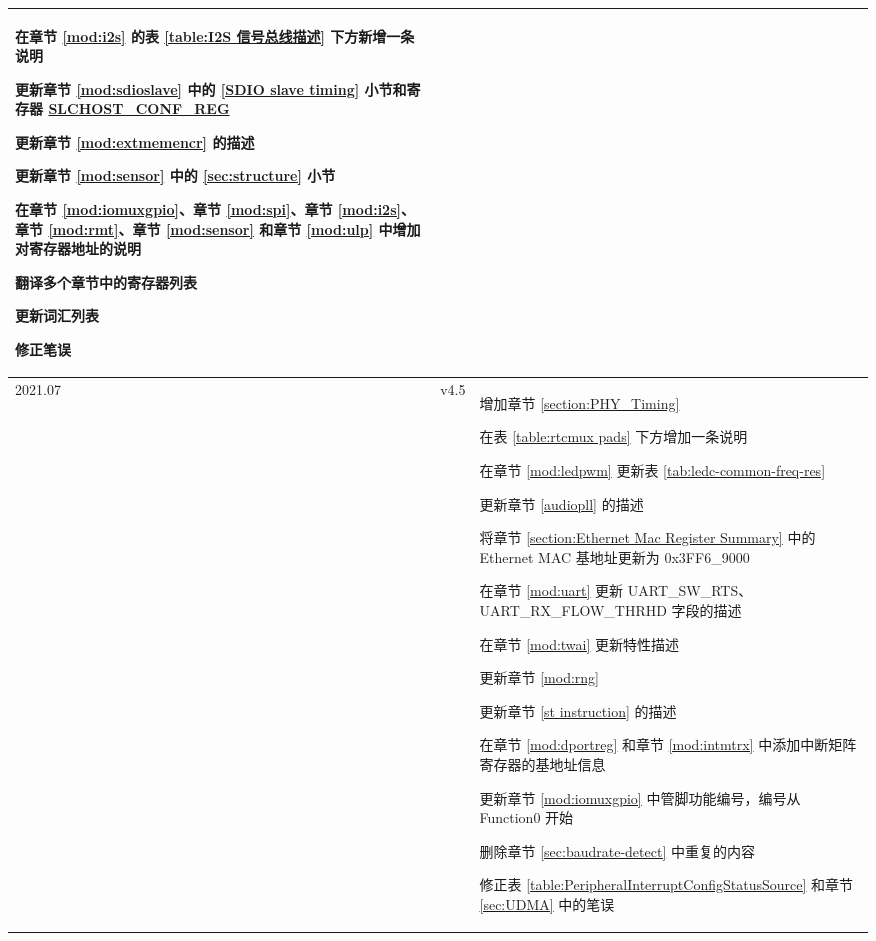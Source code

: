 \begin{longtable}[l]{ | m{2cm} | m{1.5cm} | m{12cm} | }
    在章节 \ref{mod:i2s} \textit{\nameref{mod:i2s}} 的表 \ref{table:I2S 信号总线描述} 下方新增一条说明 %

    更新章节 \ref{mod:sdioslave} \textit{\nameref{mod:sdioslave}} 中的 \ref{SDIO slave timing} 小节和寄存器 \hyperref[regdesc:SLCHOSTCONFREG]{SLCHOST\_CONF\_REG} %

    更新章节 \ref{mod:extmemencr} \textit{\nameref{mod:extmemencr}} 的描述 %

    更新章节 \ref{mod:sensor} \textit{\nameref{mod:sensor}} 中的 \ref{sec:structure} 小节 %

    在章节 \ref{mod:iomuxgpio}、章节 \ref{mod:spi}、章节 \ref{mod:i2s}、章节 \ref{mod:rmt}、章节 \ref{mod:sensor} 和章节 \ref{mod:ulp} 中增加对寄存器地址的说明 %

    翻译多个章节中的寄存器列表 %

    更新词汇列表 %

    修正笔误 %
    \\\hline
2021.07 & v4.5 &
增加章节 \ref{section:PHY_Timing} %

在表 \ref{table:rtcmux pads} 下方增加一条说明 %

在章节 \ref{mod:ledpwm} \textit{\nameref{mod:ledpwm}} 更新表 \ref{tab:ledc-common-freq-res} %

更新章节 \ref{audiopll} 的描述 %

将章节 \ref{section:Ethernet Mac Register Summary} 中的 Ethernet MAC 基地址更新为 0x3FF6\_9000 %

在章节 \ref{mod:uart} \textit{\nameref{mod:uart}} 更新 UART\_SW\_RTS、UART\_RX\_FLOW\_THRHD 字段的描述 %

在章节 \ref{mod:twai} \textit{\nameref{mod:twai}} 更新特性描述 %

更新章节 \ref{mod:rng} \textit{\nameref{mod:rng}} %

更新章节 \ref{st instruction} 的描述 %

在章节 \ref{mod:dportreg} \textit{\nameref{mod:dportreg}} 和章节 \ref{mod:intmtrx} \textit{\nameref{mod:intmtrx}} 中添加中断矩阵寄存器的基地址信息 %

更新章节 \ref{mod:iomuxgpio} \textit{\nameref{mod:iomuxgpio}} 中管脚功能编号，编号从 Function0 开始  %

删除章节 \ref{sec:baudrate-detect} 中重复的内容 %

修正表 \ref{table:PeripheralInterruptConfigStatusSource} 和章节 \ref{sec:UDMA} 中的笔误 %
\\\hline


\end{longtable}
